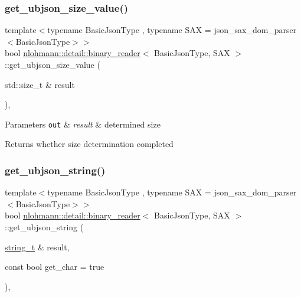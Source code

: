 \subsubsection{\texorpdfstring{get\+\_\+ubjson\+\_\+size\+\_\+value()}{get\_ubjson\_size\_value()}}
{\footnotesize\ttfamily template$<$typename Basic\+Json\+Type , typename S\+AX  = json\+\_\+sax\+\_\+dom\+\_\+parser$<$\+Basic\+Json\+Type$>$$>$ \\
bool \hyperlink{classnlohmann_1_1detail_1_1binary__reader}{nlohmann\+::detail\+::binary\+\_\+reader}$<$ Basic\+Json\+Type, S\+AX $>$\+::get\+\_\+ubjson\+\_\+size\+\_\+value (\begin{DoxyParamCaption}\item[{std\+::size\+\_\+t \&}]{result }\end{DoxyParamCaption})\hspace{0.3cm}{\ttfamily [inline]}, {\ttfamily [private]}}


\begin{DoxyParams}[1]{Parameters}
\mbox{\tt out}  & {\em result} & determined size \\
\hline
\end{DoxyParams}
\begin{DoxyReturn}{Returns}
whether size determination completed 
\end{DoxyReturn}
\mbox{\label{classnlohmann_1_1detail_1_1binary__reader_a2e01eab458020d18c975e8df55b20eca}} 
\subsubsection{\texorpdfstring{get\+\_\+ubjson\+\_\+string()}{get\_ubjson\_string()}}
{\footnotesize\ttfamily template$<$typename Basic\+Json\+Type , typename S\+AX  = json\+\_\+sax\+\_\+dom\+\_\+parser$<$\+Basic\+Json\+Type$>$$>$ \\
bool \hyperlink{classnlohmann_1_1detail_1_1binary__reader}{nlohmann\+::detail\+::binary\+\_\+reader}$<$ Basic\+Json\+Type, S\+AX $>$\+::get\+\_\+ubjson\+\_\+string (\begin{DoxyParamCaption}\item[{\hyperlink{classnlohmann_1_1detail_1_1binary__reader_aa0b9729917ca7ee6ed01e3792341316e}{string\+\_\+t} \&}]{result,  }\item[{const bool}]{get\+\_\+char = {\ttfamily true} }\end{DoxyParamCaption})\hspace{0.3cm}{\ttfamily [inline]}, {\ttfamily [private]}}



